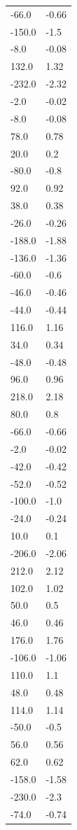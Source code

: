 \begin{longtable}{ll}
-66.0 & -0.66 \\
-150.0 & -1.5 \\
-8.0 & -0.08 \\
132.0 & 1.32 \\
-232.0 & -2.32 \\
-2.0 & -0.02 \\
-8.0 & -0.08 \\
78.0 & 0.78 \\
20.0 & 0.2 \\
-80.0 & -0.8 \\
92.0 & 0.92 \\
38.0 & 0.38 \\
-26.0 & -0.26 \\
-188.0 & -1.88 \\
-136.0 & -1.36 \\
-60.0 & -0.6 \\
-46.0 & -0.46 \\
-44.0 & -0.44 \\
116.0 & 1.16 \\
34.0 & 0.34 \\
-48.0 & -0.48 \\
96.0 & 0.96 \\
218.0 & 2.18 \\
80.0 & 0.8 \\
-66.0 & -0.66 \\
-2.0 & -0.02 \\
-42.0 & -0.42 \\
-52.0 & -0.52 \\
-100.0 & -1.0 \\
-24.0 & -0.24 \\
10.0 & 0.1 \\
-206.0 & -2.06 \\
212.0 & 2.12 \\
102.0 & 1.02 \\
50.0 & 0.5 \\
46.0 & 0.46 \\
176.0 & 1.76 \\
-106.0 & -1.06 \\
110.0 & 1.1 \\
48.0 & 0.48 \\
114.0 & 1.14 \\
-50.0 & -0.5 \\
56.0 & 0.56 \\
62.0 & 0.62 \\
-158.0 & -1.58 \\
-230.0 & -2.3 \\
-74.0 & -0.74 \\

\end{longtable}
